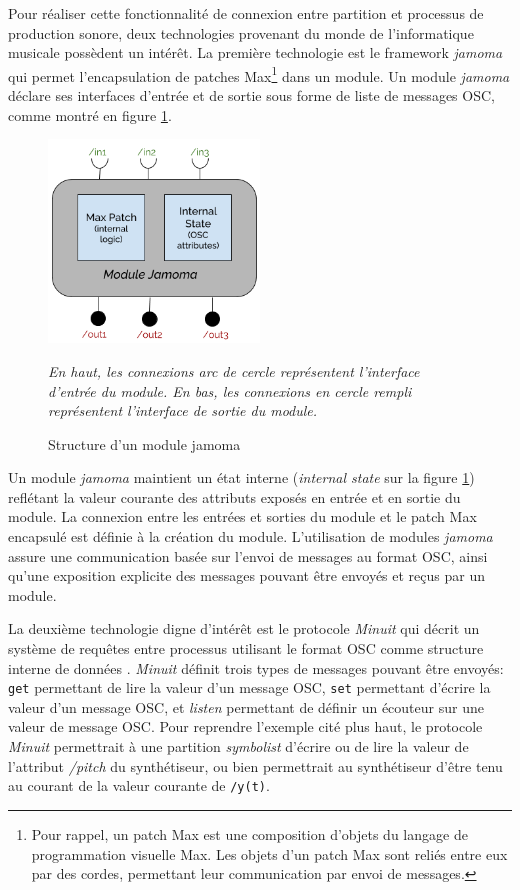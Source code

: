 Pour réaliser cette fonctionnalité de connexion entre partition et processus de production sonore, deux technologies provenant du monde de l'informatique musicale possèdent un intérêt. La première technologie est le framework \textit{jamoma} qui permet l'encapsulation de patches Max\footnote{Pour rappel, un patch Max est une composition d'objets du langage de programmation visuelle Max. Les objets d'un patch Max sont reliés entre eux par des cordes, permettant leur communication par envoi de messages.} dans un module. Un module \textit{jamoma} déclare ses interfaces d'entrée et de sortie sous forme de liste de messages OSC, comme montré en figure \ref{fig:jamomaModule}.
\begin{figure}[H]
	\centering
	\includegraphics[keepaspectratio=true, width=0.5\textwidth]{StructurationRecherche/i/jamomaModule.png}
	\caption{Structure d'un module jamoma}
	\label{fig:jamomaModule}
	\small
	\textit{ En haut, les connexions arc de cercle représentent l'interface d'entrée du module. En bas, les connexions en cercle rempli représentent l'interface de sortie du module.}
\end{figure}
Un module \textit{jamoma} maintient un état interne (\textit{internal state} sur la figure \ref{fig:jamomaModule}) reflétant la valeur courante des attributs exposés en entrée et en sortie du module.
La connexion entre les entrées et sorties du module et le patch Max encapsulé est définie à la création du module.
L'utilisation de modules \textit{jamoma} assure une communication basée sur l'envoi de messages au format OSC, ainsi qu'une exposition explicite des messages pouvant être envoyés et reçus par un module. 

La deuxième technologie digne d'intérêt est le protocole \textit{Minuit} qui décrit un système de requêtes entre processus utilisant le format OSC comme structure interne de données \cite{minuit2010}. \textit{Minuit} définit trois types de messages pouvant être envoyés: \texttt{get} permettant de lire la valeur d'un message OSC, \texttt{set} permettant d'écrire la valeur d'un message OSC, et \textit{listen} permettant de définir un écouteur sur une valeur de message OSC. Pour reprendre l'exemple cité plus haut, le protocole \textit{Minuit} permettrait à une partition \textit{symbolist} d'écrire ou de lire la valeur de l'attribut \textit{/pitch} du synthétiseur, ou bien permettrait au synthétiseur d'être tenu au courant de la valeur courante de \texttt{/y(t)}.

